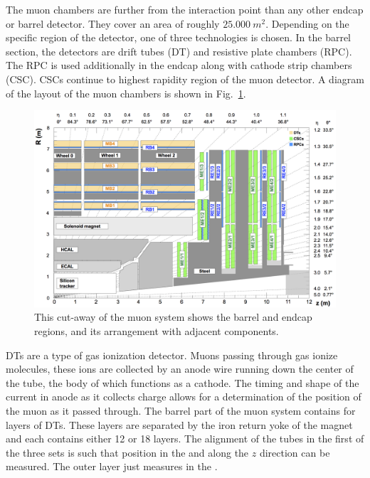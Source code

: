 The muon chambers are further from the interaction point than any other endcap or barrel detector.  They cover an area of roughly \ensuremath{\SI{25,000}{m^2}}.  Depending on the specific region of the detector, one of three technologies is chosen.  In the barrel section, the detectors are drift tubes (DT) and resistive plate chambers (RPC).  The RPC is used additionally in the endcap along with cathode strip chambers (CSC).  CSCs continue to highest rapidity region of the muon detector.  A diagram of the layout of the muon chambers is shown in Fig.~\ref{fig:muonchambers}.

\begin{figure}[!tp]
    \centering
    \includegraphics[width=\textwidth]{figures/muonSystem.png}
    \caption[
       \CMS muon chambers diagram.
    ]{
        This cut-away of the muon system shows the barrel and endcap regions, and its arrangement with adjacent \CMS components.\cite{muonDPG13TeV}
    }
    \label{fig:muonchambers}
\end{figure}

DTs are a type of gas ionization detector.  Muons passing through gas ionize molecules, these ions are collected by an anode wire running down the center of the tube, the body of which functions as a cathode.  The timing and shape of the current in anode as it collects charge allows for a determination of the position of the muon as it passed through.  The barrel part of the muon system contains for layers of DTs.  These layers are separated by the iron return yoke of the magnet and each contains either 12 or 18 layers.  The alignment of the tubes in the first of the three sets is such that position in the \rphiplane and along the \ensuremath{z} direction can be measured.  The outer layer just measures in the \rphiplane.

